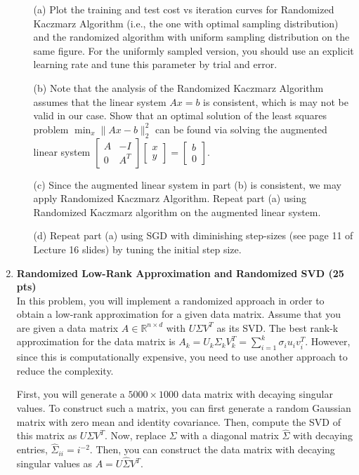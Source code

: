 \begin{enumerate}
\begin{itemize}
    \item[(a)] Plot the training and test cost vs iteration curves for Randomized Kaczmarz Algorithm (i.e., the one with optimal sampling distribution) and the randomized algorithm with uniform sampling distribution on the same figure. For the uniformly sampled version, you should use an explicit learning rate and tune this parameter by trial and error.
    \item[(b)] Note that the analysis of the Randomized Kaczmarz Algorithm assumes that the linear system $Ax=b$ is consistent, which is may not be valid in our case. Show that an optimal solution of the least squares problem $\min_x \|Ax-b\|_2^2$ can be found via solving the augmented linear system $\left[ \begin{array}{cc} A & - I \\ 0 & A^T   \end{array} \right] \left[ \begin{array}{c} x \\  y  \end{array} \right] = \left[ \begin{array}{c} b \\  0  \end{array} \right]$. 
    \item[(c)] Since the augmented linear system in part (b) is consistent, we may apply Randomized Kaczmarz Algorithm. Repeat part (a) using Randomized Kaczmarz algorithm on the augmented linear system.
    \item[(d)] Repeat part (a) using SGD with diminishing step-sizes (see page 11 of Lecture 16 slides) by tuning the initial step size.
\end{itemize}
\solution{
}



\newpage
\item \textbf{ Randomized Low-Rank Approximation and Randomized SVD (25 pts)}\\
In this problem, you will implement a randomized approach in order to obtain a low-rank approximation for a given data matrix. Assume that you are given a data matrix $A\in \mathbb{R}^{n \times d}$ with $U \Sigma V^T$ as its SVD. The best rank-k approximation for the data matrix is $A_k=U_k \Sigma_k V_k^T=\sum_{i=1}^k \sigma_i u_i v_i^T$. However, since this is computationally expensive, you need to use another approach to reduce the complexity. 

First, you will generate a $5000\times 1000$ data matrix with decaying singular values. To construct such a matrix, you can first generate a random Gaussian matrix with zero mean and identity covariance. Then, compute the SVD of this matrix as $U \Sigma V^T$. Now, replace $\Sigma$ with a diagonal matrix $\hat \Sigma$ with decaying entries, $\hat \Sigma_{ii}={i^{-2}}$. Then, you can construct the data matrix with decaying singular values as $A=U\hat{\Sigma}V^T$.


\end{enumerate}
